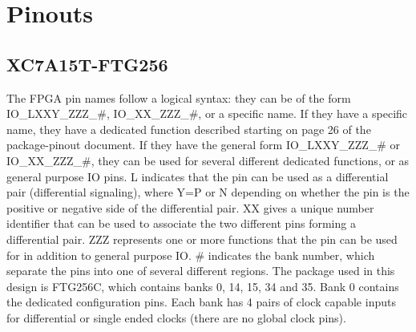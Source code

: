 \chapter{Pinouts}
\label{cha:pinouts}

\section{XC7A15T-FTG256}
\label{sec:xc7a15t-ftg256-pinout}

The FPGA pin names follow a logical syntax: they can be of the form IO\_LXXY\_ZZZ\_\#,
IO\_XX\_ZZZ\_\#, or a specific name. If they have a specific name, they have a dedicated function
described starting on page 26 of the package-pinout document. If they have the general form
IO\_LXXY\_ZZZ\_\# or IO\_XX\_ZZZ\_\#, they can be used for several different dedicated functions, or
as general purpose IO pins. L indicates that the pin can be used as a differential pair
(differential signaling), where Y=P or N depending on whether the pin is the positive or negative
side of the differential pair. XX gives a unique number identifier that can be used to associate the
two different pins forming a differential pair. ZZZ represents one or more functions that the pin
can be used for in addition to general purpose IO\@. \# indicates the bank number, which separate
the pins into one of several different regions. The package used in this design is FTG256C, which
contains banks 0, 14, 15, 34 and 35. Bank 0 contains the dedicated configuration pins. Each bank has
4 pairs of clock capable inputs for differential or single ended clocks (there are no global clock
pins).


